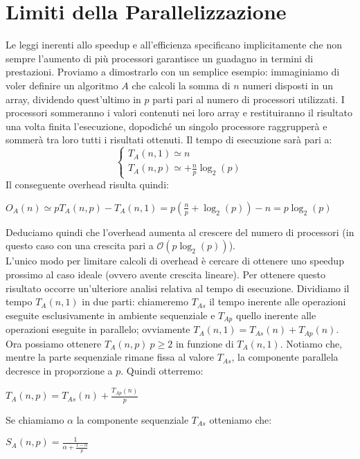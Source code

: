 \section{Limiti della Parallelizzazione}
Le leggi inerenti allo speedup e all'efficienza specificano implicitamente che non sempre l'aumento di più processori garantisce un guadagno in termini di prestazioni. Proviamo a dimostrarlo con un semplice esempio: immaginiamo di voler definire un algoritmo $A$ che calcoli la somma di $n$ numeri disposti in un array, dividendo quest'ultimo in $p$ parti pari al numero di processori utilizzati. I processori sommeranno i valori contenuti nei loro array e restituiranno il risultato una volta finita l'esecuzione, dopodiché un singolo processore raggrupperà e sommerà tra loro tutti i risultati ottenuti. Il tempo di esecuzione sarà pari a:
\[\left\{
  \begin{array}{lr}
   T_{A}(n,1) \simeq n\\
   T_{A}(n,p) \simeq + \frac{n}{p} \log_2(p)
  \end{array}
\right.
\]
Il conseguente overhead risulta quindi:
\begin{center}
$O_{A}(n) \simeq p T_{A}(n,p) - T_{A}(n,1) = p(\frac{n}{p} + \log_2(p)) - n = p \log_2(p)$
\end{center} 
Deduciamo quindi che l'overhead aumenta al crescere del numero di processori (in questo caso con una crescita pari a $\mathcal{O}(p \log_2(p))$).\\
L'unico modo per limitare calcoli di overhead è cercare di ottenere uno speedup prossimo al caso ideale (ovvero avente crescita lineare). Per ottenere questo risultato occorre un'ulteriore analisi relativa al tempo di esecuzione. Dividiamo il tempo $T_A(n,1)$ in due parti: chiameremo $T_{As}$ il tempo inerente alle operazioni eseguite esclusivamente in ambiente sequenziale e $T_{Ap}$ quello inerente alle operazioni eseguite in parallelo; ovviamente $T_A(n,1) = T_{As}(n) + T_{Ap}(n)$. Ora possiamo ottenere $T_A(n,p) \ p \geq 2$ in funzione di $T_A(n,1)$. Notiamo che, mentre la parte sequenziale rimane fissa al valore $T_{As}$, la componente parallela decresce in proporzione a $p$. Quindi otterremo:
\begin{center}
$\displaystyle T_{A}(n,p) = T_{As}(n) + \frac{T_{Ap}(n)}{p}$
\end{center}
Se chiamiamo $\alpha$ la componente sequenziale $T_{As}$ otteniamo che:
\begin{center}
$\displaystyle S_{A}(n,p) = \frac{1}{\displaystyle \alpha + \frac{1-\alpha}{p}}$
\end{center}
